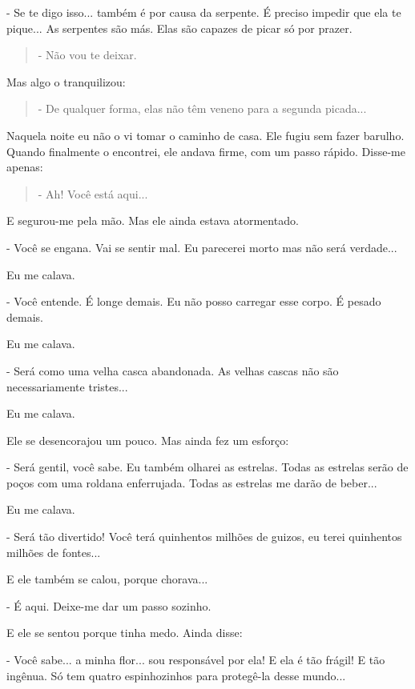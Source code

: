 - Se te digo isso... também é por causa da serpente. É preciso impedir
que ela te pique... As serpentes são más. Elas são capazes de picar só
por prazer.

\begin{quote}
- Não vou te deixar.
\end{quote}

Mas algo o tranquilizou:

\begin{quote}
- De qualquer forma, elas não têm veneno para a segunda picada...
\end{quote}

Naquela noite eu não o vi tomar o caminho de casa. Ele fugiu sem fazer
barulho. Quando finalmente o encontrei, ele andava firme, com um passo
rápido. Disse-me apenas:

\begin{quote}
- Ah! Você está aqui...
\end{quote}

E segurou-me pela mão. Mas ele ainda estava atormentado.

- Você se engana. Vai se sentir mal. Eu parecerei morto mas não será
verdade...

Eu me calava.

- Você entende. É longe demais. Eu não posso carregar esse corpo. É
pesado demais.

Eu me calava.

- Será como uma velha casca abandonada. As velhas cascas não são
necessariamente tristes...

Eu me calava.

Ele se desencorajou um pouco. Mas ainda fez um esforço:

- Será gentil, você sabe. Eu também olharei as estrelas. Todas as
estrelas serão de poços com uma roldana enferrujada. Todas as estrelas
me darão de beber...

Eu me calava.

- Será tão divertido! Você terá quinhentos milhões de guizos, eu terei
quinhentos milhões de fontes...

E ele também se calou, porque chorava...

- É aqui. Deixe-me dar um passo sozinho.

E ele se sentou porque tinha medo. Ainda disse:

- Você sabe... a minha flor... sou responsável por ela! E ela é tão
frágil! E tão ingênua. Só tem quatro espinhozinhos para protegê-la desse
mundo...

